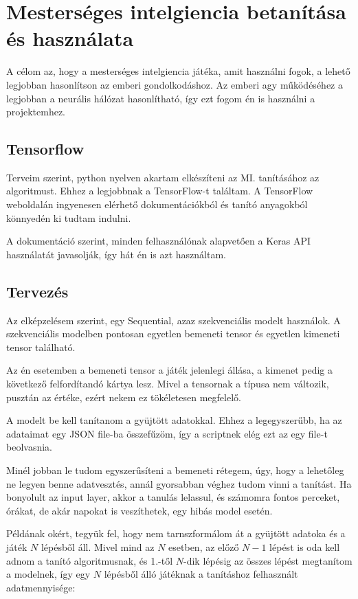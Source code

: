 \chapter{Mesterséges intelgiencia betanítása és használata}
\thispagestyle{fancy}
\pagestyle{fancy}


A célom az, hogy a mesterséges intelgiencia játéka, amit használni fogok, a lehető legjobban hasonlítson az emberi gondolkodáshoz. Az emberi agy működéséhez a legjobban 
a neurális hálózat hasonlítható, így ezt fogom én is használni a projektemhez. 



\section{Tensorflow}
Terveim szerint, python nyelven akartam elkészíteni az MI. tanításához az algoritmust. Ehhez a legjobbnak a TensorFlow-t \cite{tensorflow2015-whitepaper} találtam. A TensorFlow weboldalán ingyenesen elérhető dokumentációkból és tanító anyagokból  könnyedén ki tudtam indulni. 

A dokumentáció szerint, minden felhasználónak alapvetően a Keras API használatát javasolják, így hát én is azt használtam. 

\section{Tervezés}
Az elképzelésem szerint, egy Sequential, azaz szekvenciális modelt használok. A szekvenciális modelben pontosan egyetlen bemeneti tensor és egyetlen kimeneti tensor található. 

Az én esetemben a bemeneti tensor a játék jelenlegi állása, a kimenet pedig a következő felfordítandó kártya lesz. Mivel a tensornak a típusa nem változik, pusztán az értéke, ezért nekem ez tökéletesen megfelelő. 

A modelt be kell tanítanom a gyüjtött adatokkal. Ehhez a legegyszerűbb, ha az adataimat egy JSON file-ba összefűzöm, így a scriptnek elég ezt az egy file-t beolvasnia. 

Minél jobban le tudom egyszerűsíteni a bemeneti rétegem, úgy, hogy a lehetőleg ne legyen benne adatvesztés, annál gyorsabban véghez tudom vinni a tanítást. 
Ha bonyolult az input layer, akkor a tanulás lelassul, és számomra fontos perceket, órákat, de akár napokat is veszíthetek, egy hibás model esetén. 

Példának okért, tegyük fel, hogy nem tarnszformálom át a gyüjtött adatoka és a játék $N$ lépésből áll. Mivel mind az $N$ esetben, az előző $N-1$ lépést is oda kell adnom a tanító algoritmusnak, és 1.-től $N$-dik lépésig az összes lépést megtanítom a modelnek, így 
egy $N$ lépésből álló játéknak a tanításhoz felhasznált adatmennyisége:

